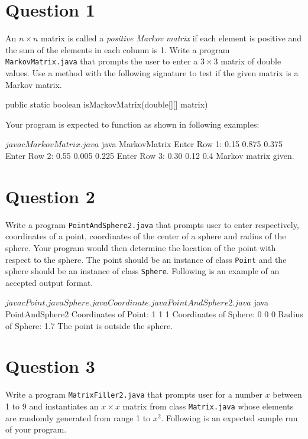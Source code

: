 \section*{Question 1}

An $n \times n$ matrix is called a \textit{positive Markov matrix} if each element is positive and the sum of the elements in each column is 1.
Write a program \texttt{MarkovMatrix.java} that prompts the user to enter a $3 \times 3$ matrix of double values.
Use a method with the following signature to test if the given matrix is a Markov matrix.

\begin{terminal}
public static boolean isMarkovMatrix(double[][] matrix)
\end{terminal}

Your program is expected to function as shown in following examples:

\begin{terminal}
$ javac MarkovMatrix.java
$ java MarkovMatrix
Enter Row 1: 0.15 0.875 0.375
Enter Row 2: 0.55 0.005 0.225
Enter Row 3: 0.30 0.12 0.4
Markov matrix given.
\end{terminal}

\section*{Question 2}
Write a program \texttt{PointAndSphere2.java} that prompts user to enter respectively, coordinates of a point, coordinates of the center of a sphere and radius of the sphere.
Your program would then determine the location of the point with respect to the sphere.
The point should be an instance of class \texttt{Point} and the sphere should be an instance of class \texttt{Sphere}.
Following is an example of an accepted output format.

\vfill
\newpage

\begin{terminal}
$ javac Point.java Sphere.java Coordinate.java PointAndSphere2.java
$ java PointAndSphere2
Coordinates of Point: 1 1 1
Coordinates of Sphere: 0 0 0
Radius of Sphere: 1.7
The point is outside the sphere.
\end{terminal}

\section*{Question 3}
Write a program \texttt{MatrixFiller2.java} that prompts user for a number $x$ between 1 to 9 and instantiates an $x \times x$ matrix from class \texttt{Matrix.java} whose elements are randomly generated from range 1 to $x^2$.
Following is an expected sample run of your program.

